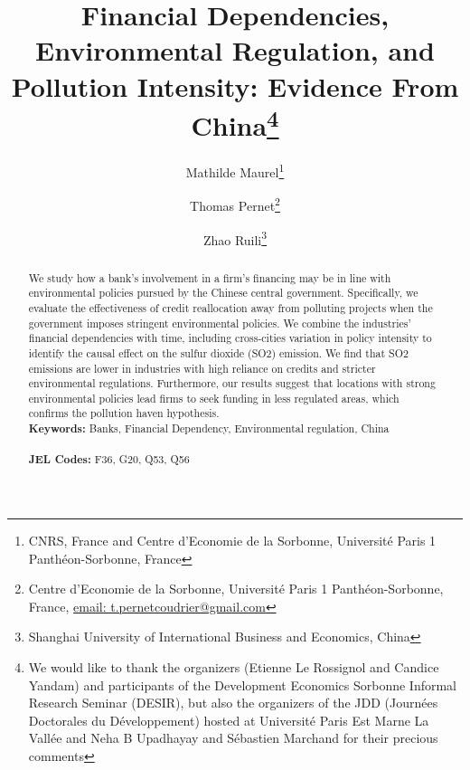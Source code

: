 \documentclass[12pt]{article}
\begin{document}
\begin{titlepage}

\title{Financial Dependencies, Environmental Regulation, and Pollution Intensity: Evidence From China\thanks{We would like to thank the organizers (Etienne Le Rossignol and Candice Yandam) and participants of the Development Economics Sorbonne Informal Research Seminar (DESIR), but also the organizers of the JDD (Journées Doctorales du Développement) hosted at Université Paris Est Marne La Vallée and Neha B Upadhayay and Sébastien Marchand for their precious comments}}
\author{
Mathilde Maurel\thanks{CNRS, France and Centre d'Economie de la Sorbonne, Université Paris 1 Panthéon-Sorbonne, France} 
\and Thomas Pernet\thanks{Centre d'Economie de la Sorbonne, Université Paris 1 Panthéon-Sorbonne, France,
\href{mailto:t.pernetcoudrier@gmail.com}{email: t.pernetcoudrier@gmail.com} 
}
\and Zhao Ruili\thanks{Shanghai University of International Business and Economics, China}
}

\date{}

\maketitle
\begin{abstract}
\noindent We study how a bank’s involvement in a firm's financing may be in line with environmental policies pursued by the Chinese central government. Specifically, we evaluate the effectiveness of credit reallocation away from polluting projects when the government imposes stringent environmental policies. We combine the industries' financial dependencies with time, including cross-cities variation in policy intensity to identify the causal effect on the sulfur dioxide (SO2) emission. We find that SO2 emissions are lower in industries with high reliance on credits and stricter environmental regulations. Furthermore, our results suggest that locations with strong environmental policies lead firms to seek funding in less regulated areas, which confirms the pollution haven hypothesis.
\vspace{0em}\\
\noindent\textbf{Keywords:} Banks, Financial Dependency, Environmental regulation, China\\
\vspace{0em}\\
\noindent\textbf{JEL Codes:} F36, G20, Q53, Q56\\

\bigskip
\end{abstract}
\setcounter{page}{0}
\thispagestyle{empty}
\end{titlepage}
\pagebreak \newpage
\end{document}
